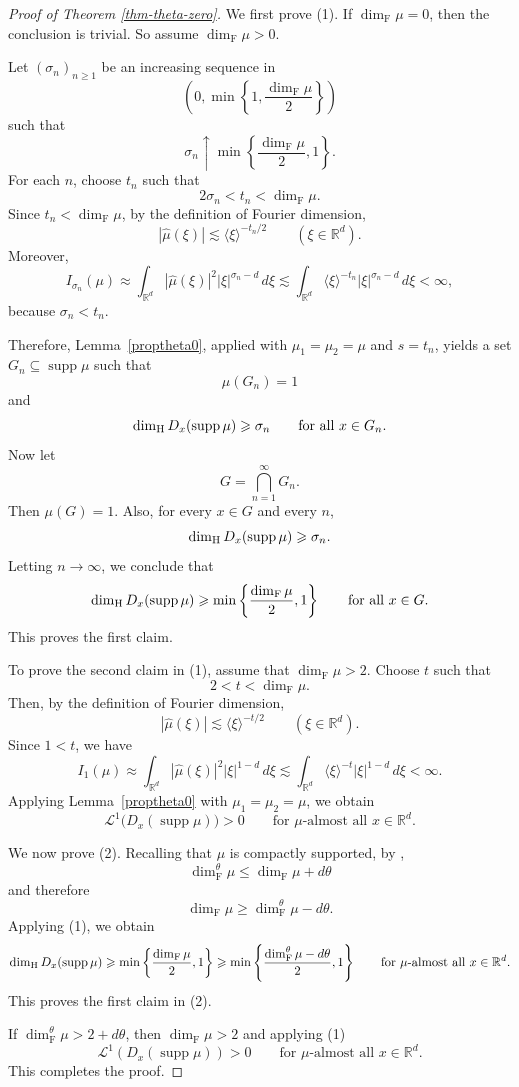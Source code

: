 \documentclass[11pt]{amsart}
\numberwithin{equation}{section}
\renewcommand{\ge}{\geqslant}
\renewcommand{\le}{\leqslant}
\newcommand{\hd}{\dim_{\textup{H}}}
\newcommand{\fs}{\dim^\theta_{\mathrm{F}}}
\newcommand{\fd}{\dim_{\mathrm{F}}}
\newcommand{\spt}{\operatorname{supp}}
\theoremstyle{plain}
\theoremstyle{remark}
\newcommand{\Rd}{\mathbb{R}^d}
\newcommand{\cL}{\mathcal{L}}
\begin{document}
\begin{proof}[Proof of Theorem \ref{thm-theta-zero}]
We first prove (1). If \(\fd\mu=0\), then the conclusion is trivial. So assume
\(\fd\mu>0\).

Let \((\sigma_n)_{n\ge 1}\) be an increasing sequence in
\[
\left(0,\min\left\{1,\frac{\fd\mu}{2}\right\}\right)
\]
such that
\[
\sigma_n\uparrow \min\left\{\frac{\fd\mu}{2},1\right\}.
\]
For each \(n\), choose \(t_n\) such that
\[
2\sigma_n<t_n<\fd\mu.
\]
Since \(t_n<\fd\mu\), by the definition of Fourier dimension,
\[
|\widehat{\mu}(\xi)|\lesssim \langle \xi\rangle^{-t_n/2}
\qquad (\xi\in\Rd).
\]
Moreover,
\[
I_{\sigma_n}(\mu)
\approx
\int_{\Rd} |\widehat{\mu}(\xi)|^2 |\xi|^{\sigma_n-d}\,d\xi
\lesssim
\int_{\Rd} \langle \xi\rangle^{-t_n} |\xi|^{\sigma_n-d}\,d\xi
<\infty,
\]
because \(\sigma_n<t_n\).

Therefore, Lemma~\ref{proptheta0}, applied with
\(\mu_1=\mu_2=\mu\) and \(s=t_n\), yields a set \(G_n\subseteq \spt\mu\) such that
\[
\mu(G_n)=1
\]
and
\[
\hd D_x(\spt\mu)\ge \sigma_n
\qquad\text{for all }x\in G_n.
\]
Now let
\[
G=\bigcap_{n=1}^\infty G_n.
\]
Then \(\mu(G)=1\). Also, for every \(x\in G\) and every \(n\),
\[
\hd D_x(\spt\mu)\ge \sigma_n.
\]
Letting \(n\to\infty\), we conclude that
\[
\hd D_x(\spt\mu)\ge \min\left\{\frac{\fd\mu}{2},1\right\}
\qquad\text{for all }x\in G.
\]
This proves the first claim.

To prove the second claim in (1), assume that \(\fd\mu>2\). Choose \(t\) such that
\[
2<t<\fd\mu.
\]
Then, by the definition of Fourier dimension,
\[
|\widehat{\mu}(\xi)|\lesssim \langle \xi\rangle^{-t/2}
\qquad (\xi\in\Rd).
\]
Since \(1<t\), we have
\[
I_1(\mu)
\approx
\int_{\Rd} |\widehat{\mu}(\xi)|^2 |\xi|^{1-d}\,d\xi
\lesssim
\int_{\Rd} \langle \xi\rangle^{-t} |\xi|^{1-d}\,d\xi
<\infty.
\]
Applying Lemma~\ref{proptheta0} with \(\mu_1=\mu_2=\mu\), we obtain
\[
\cL^1\bigl(D_x(\spt\mu)\bigr)>0
\qquad\text{for \(\mu\)-almost all }x\in\Rd.
\]

We now prove (2). Recalling that $\mu$ is compactly supported, by \cite[Proposition~4.2]{restriction2},
\[
\fs\mu \le \fd\mu + d\theta
\]
and therefore
\[
\fd\mu \ge \fs\mu-d\theta.
\]
Applying (1), we obtain
\[
\hd D_x(\spt\mu)\ge \min\left\{\frac{\fd\mu}{2},1\right\}
\ge
\min\left\{\frac{\fs\mu-d\theta}{2},1\right\}
\qquad\text{for \(\mu\)-almost all }x\in\Rd.
\]
This proves the first claim in (2).

If \(\fs\mu > 2+d\theta\), then $\fd \mu>2$ and applying (1) 
\[
\mathcal{L}^1\left(D_x(\spt\mu)\right)>0 
\qquad\text{for \(\mu\)-almost all }x\in\Rd.
\]
This completes the proof.
\end{proof}
\end{document}
